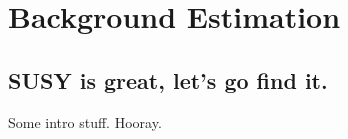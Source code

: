 \chapter{Background Estimation}

\ifpdf
    \graphicspath{{Chapter6/Figs/Raster/}{Chapter6/Figs/PDF/}{Chapter6/Figs/}}
\else
    \graphicspath{{Chapter6/Figs/Vector/}{Chapter6/Figs/}}
\fi


\section{SUSY is great, let's go find it.}  %

Some intro stuff. Hooray.